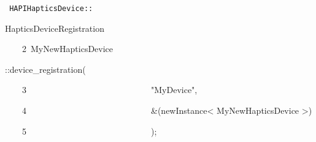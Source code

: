 {
\tt
{HAPIHapticsDevice}{\hlsym ::}{\hlstd HapticsDeviceRegistration\leavevmode\par
{\hlline \ \ \ \ 2\ }MyNewHapticsDevice}{\hlsym ::}{\hlstd }{\hlkwd device\_{}registration}{\hlstd }{\hlsym (}\leavevmode\par
{\hlline \ \ \ \ 3\ }{\hlstd }{\hlstd\ \ \ \ \ \ \ \ \ \ \ \ \ \ \ \ \ \ \ \ \ \ \ \ \ \ \ \ }{\hlstd }{\hlstr "MyDevice"}{\hlstd }{\hlsym ,}\leavevmode\par
{\hlline \ \ \ \ 4\ }{\hlstd }{\hlstd\ \ \ \ \ \ \ \ \ \ \ \ \ \ \ \ \ \ \ \ \ \ \ \ \ \ \ \ }{\hlstd }{\hlsym \&(}{\hlstd newInstance}{\hlsym $\mathord{<}$ }{\hlstd MyNewHapticsDevice }{\hlsym $\mathord{>}$)}\leavevmode\par
{\hlline \ \ \ \ 5\ }{\hlstd }{\hlstd\ \ \ \ \ \ \ \ \ \ \ \ \ \ \ \ \ \ \ \ \ \ \ \ \ \ \ \ }{\hlstd }{\hlsym );}{\hlstd }\leavevmode\par
}

